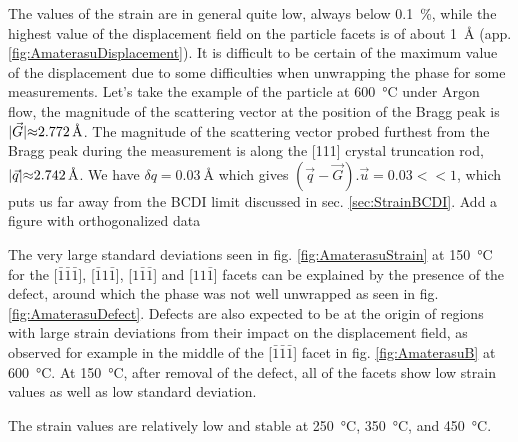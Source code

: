The values of the strain are in general quite low, always below \qty{0.1}{\percent}, while the highest value of the displacement field on the particle facets is of about \qty{1}{\angstrom} (app. \ref{fig:AmaterasuDisplacement}).
It is difficult to be certain of the maximum value of the displacement due to some difficulties when unwrapping the phase for some measurements.
Let's take the example of the particle at \qty{600}{\degreeCelsius} under Argon flow, the magnitude of the scattering vector at the position of the Bragg peak is $|\vec{G}| \qty{\approx 2.772}{\angstrom}$.
The magnitude of the scattering vector probed furthest from the Bragg peak during the measurement is along the [111] crystal truncation rod, $|\vec{q}| \qty{\approx 2.742}{\angstrom}$.
We have $\delta q = \qty{0.03}{\angstrom}$ which gives $(\vec{q}-\vec{G}).\vec{u} = 0.03 <<1$, which puts us far away from the BCDI limit discussed in sec. \ref{sec:StrainBCDI}.
\textcolor{Important}{Add a figure with orthogonalized data}

The very large standard deviations seen in fig. \ref{fig:AmaterasuStrain} at \qty{150}{\degreeCelsius} for the [$\bar{1}\bar{1}\bar{1}$], [$\bar{1}1\bar{1}$], [$1\bar{1}\bar{1}$] and [$11\bar{1}$] facets can be explained by the presence of the defect, around which the phase was not well unwrapped as seen in fig. \ref{fig:AmaterasuDefect}.
Defects are also expected to be at the origin of regions with large strain deviations from their impact on the displacement field, as observed for example in the middle of the [$\bar{1}\bar{1}\bar{1}$] facet in fig. \ref{fig:AmaterasuB} at \qty{600}{\degreeCelsius}.
At \qty{150}{\degreeCelsius}, after removal of the defect, all of the facets show low strain values as well as low standard deviation.

The strain values are relatively low and stable at \qty{250}{\degreeCelsius}, \qty{350}{\degreeCelsius}, and \qty{450}{\degreeCelsius}.


